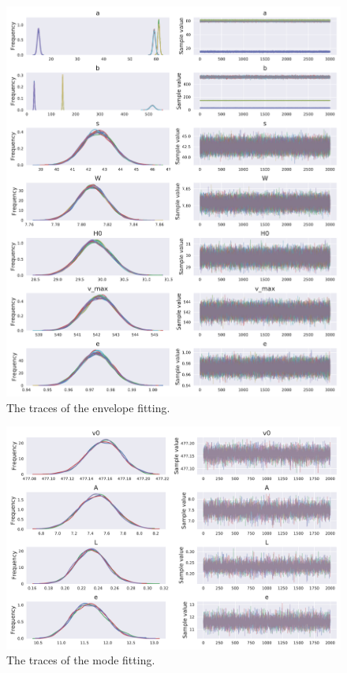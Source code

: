 \documentclass[
    aip,
    jmp,
    reprint,
    nofootinbib,
    floatfix
    ]{revtex4-1}
\begin{document}
    \begin{figure}
        \centering
        \includegraphics[width=\linewidth]{../figs/trace1}
        \caption{The traces of the envelope fitting.}
        \label{fig:envtrace}
    \end{figure}

    
    \begin{figure}
        \centering
        \includegraphics[width=\linewidth]{../figs/mode_trace}
        \caption{The traces of the mode fitting.}
        \label{fig:modetrace}
    \end{figure}

    
\end{document}
